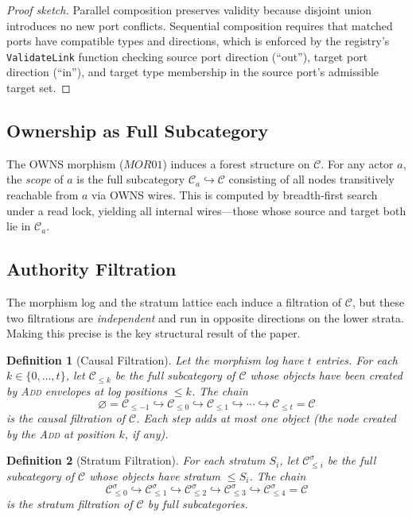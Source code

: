 \documentclass[submission,copyright,creativecommons]{eptcs}
\newtheorem{definition}{Definition}
\begin{document}
\begin{proof}[Proof sketch]
Parallel composition preserves validity because disjoint union introduces no
new port conflicts. Sequential composition requires that matched ports have
compatible types and directions, which is enforced by the registry's
\texttt{ValidateLink} function checking source port direction (``out''), target
port direction (``in''), and target type membership in the source port's
admissible target set.
\end{proof}

\subsection{Ownership as Full Subcategory}

The OWNS morphism ($\mathit{MOR01}$) induces a forest structure on
$\mathcal{C}$. For any actor $a$, the \emph{scope} of $a$ is the full
subcategory $\mathcal{C}_a \hookrightarrow \mathcal{C}$ consisting of all
nodes transitively reachable from $a$ via OWNS wires. This is computed by
breadth-first search under a read lock, yielding all internal wires---those
whose source and target both lie in $\mathcal{C}_a$.

\subsection{Authority Filtration}
\label{subsec:authority}

The morphism log and the stratum lattice each induce a filtration of
$\mathcal{C}$, but these two filtrations are \emph{independent} and run in
opposite directions on the lower strata. Making this precise is the key
structural result of the paper.

\begin{definition}[Causal Filtration]
\label{def:causal-filtration}
Let the morphism log have $t$ entries. For each $k \in \{0, \ldots, t\}$,
let $\mathcal{C}_{\leq k}$ be the full subcategory of $\mathcal{C}$ whose
objects have been created by \textsc{Add} envelopes at log positions
$\leq k$. The chain
\[
\varnothing = \mathcal{C}_{\leq -1}
\hookrightarrow \mathcal{C}_{\leq 0}
\hookrightarrow \mathcal{C}_{\leq 1}
\hookrightarrow \cdots
\hookrightarrow \mathcal{C}_{\leq t} = \mathcal{C}
\]
is the \emph{causal filtration} of $\mathcal{C}$. Each step adds at most one
object (the node created by the \textsc{Add} at position $k$, if any).
\end{definition}

\begin{definition}[Stratum Filtration]
\label{def:stratum-filtration}
For each stratum $S_i$, let $\mathcal{C}^{\sigma}_{\leq i}$ be the full
subcategory of $\mathcal{C}$ whose objects have stratum $\leq S_i$. The chain
\[
\mathcal{C}^{\sigma}_{\leq 0} \hookrightarrow
\mathcal{C}^{\sigma}_{\leq 1} \hookrightarrow
\mathcal{C}^{\sigma}_{\leq 2} \hookrightarrow
\mathcal{C}^{\sigma}_{\leq 3} \hookrightarrow
\mathcal{C}^{\sigma}_{\leq 4} = \mathcal{C}
\]
is the \emph{stratum filtration} of $\mathcal{C}$ by full subcategories.
\end{definition}
\end{document}

